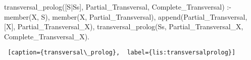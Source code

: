 \begin{center}
\begin{minipage}{\linewidth}
\begin{python}[numbers=left]
transversal_prolog([S|Ss], 
                   Partial_Transversal, 
                   Complete_Transversal) :-
    member(X, S),
    \+ member(X, Partial_Transversal),
    append(Partial_Transversal, [X], Partial_Transversal_X),
    transversal_prolog(Ss, 
                       Partial_Transversal_X, 
                       Complete_Transversal_X).

\end{python}
\begin{lstlisting} [caption={transversal\_prolog},  label={lis:transversalprolog}]
\end{lstlisting}
\end{minipage}

\end{center}



